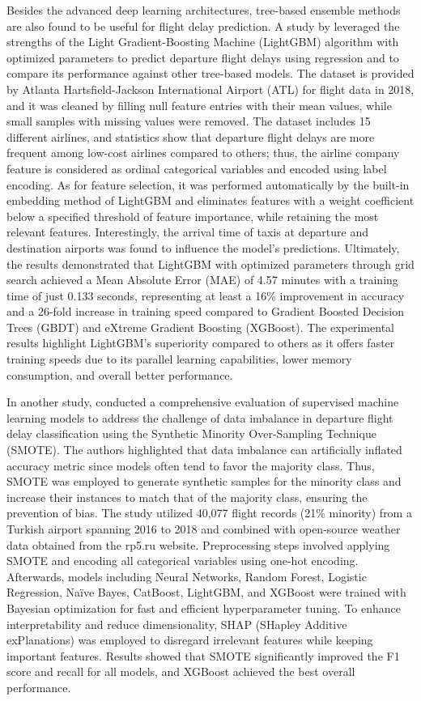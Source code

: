 \documentclass[twoside,11pt]{article}
\begin{document}
Besides the advanced deep learning architectures, tree-based ensemble methods are also found to be useful for flight delay prediction. A study by \cite{tao2021flight} leveraged the strengths of the Light Gradient-Boosting Machine (LightGBM) algorithm with optimized parameters to predict departure flight delays using regression and to compare its performance against other tree-based models. The dataset is provided by Atlanta Hartsfield-Jackson International Airport (ATL) for flight data in 2018, and it was cleaned by filling null feature entries with their mean values, while small samples with missing values were removed. The dataset includes 15 different airlines, and statistics show that departure flight delays are more frequent among low-cost airlines compared to others; thus, the airline company feature is considered as ordinal categorical variables and encoded using label encoding. As for feature selection, it was performed automatically by the built-in embedding method of LightGBM and eliminates features with a weight coefficient below a specified threshold of feature importance, while retaining the most relevant features. Interestingly, the arrival time of taxis at departure and destination airports was found to influence the model’s predictions. Ultimately, the results demonstrated that LightGBM with optimized parameters through grid search achieved a Mean Absolute Error (MAE) of 4.57 minutes with a training time of just 0.133 seconds, representing at least a 16\% improvement in accuracy and a 26-fold increase in training speed compared to Gradient Boosted Decision Trees (GBDT) and eXtreme Gradient Boosting (XGBoost). The experimental results highlight LightGBM’s superiority compared to others as it offers faster training speeds due to its parallel learning capabilities, lower memory consumption, and overall better performance. 

In another study, \cite{hatipoglu2024predictive} conducted a comprehensive evaluation of supervised machine learning models to address the challenge of data imbalance in departure flight delay classification using the Synthetic Minority Over-Sampling Technique (SMOTE). The authors highlighted that data imbalance can artificially inflated accuracy metric since models often tend to favor the majority class. Thus, SMOTE was employed to generate synthetic samples for the minority class and increase their instances to match that of the majority class, ensuring the prevention of bias. The study utilized 40,077 flight records (21\% minority) from a Turkish airport spanning 2016 to 2018 and combined with open-source weather data obtained from the rp5.ru website. Preprocessing steps involved applying SMOTE and encoding all categorical variables using one-hot encoding. Afterwards, models including Neural Networks, Random Forest, Logistic Regression, Naïve Bayes, CatBoost, LightGBM, and XGBoost were trained with Bayesian optimization for fast and efficient hyperparameter tuning. To enhance interpretability and reduce dimensionality, SHAP (SHapley Additive exPlanations) was employed to disregard irrelevant features while keeping important features. Results showed that SMOTE significantly improved the F1 score and recall for all models, and XGBoost achieved the best overall performance.
\end{document}
